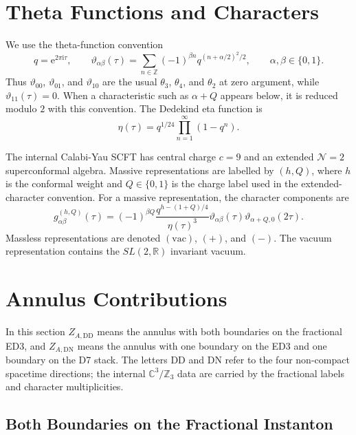 \documentclass[11pt]{article}
\newcommand{\C}{\mathbb{C}}
\newcommand{\R}{\mathbb{R}}
\newcommand{\Z}{\mathbb{Z}}
\newcommand{\vac}{\mathrm{vac}}
\newcommand{\DN}{\mathrm{DN}}
\newcommand{\DD}{\mathrm{DD}}
\newcommand{\ii}{\mathrm{i}}
\newcommand{\e}{\mathrm{e}}
\newcommand{\vart}{\vartheta}
\newcommand{\etaD}{\eta}
\begin{document}
\section{Theta Functions and Characters}

We use the theta-function convention
\begin{equation}
  q=\e^{2\pi \ii\tau},
  \qquad
  \vart_{\alpha\beta}(\tau)
  =
  \sum_{n\in\Z}
  (-1)^{\beta n}
  q^{(n+\alpha/2)^2/2},
  \qquad
  \alpha,\beta\in\{0,1\}.
  \label{eq:theta-convention}
\end{equation}
Thus $\vart_{00}$, $\vart_{01}$, and $\vart_{10}$ are the usual $\theta_3$, $\theta_4$,
and $\theta_2$ at zero argument, while $\vart_{11}(\tau)=0$. When a characteristic such as
$\alpha+Q$ appears below, it is reduced modulo $2$ with this convention. The Dedekind eta
function is
\begin{equation}
  \etaD(\tau)=q^{1/24}\prod_{n=1}^{\infty}(1-q^n).
  \label{eq:dedekind-eta-definition}
\end{equation}

The internal Calabi-Yau SCFT has central charge $c=9$ and an extended
$\mathcal N=2$ superconformal algebra. Massive representations are labelled by
$(h,Q)$, where $h$ is the conformal weight and $Q\in\{0,1\}$ is the charge label used in the
extended-character convention. For a massive representation, the character components are
\begin{equation}
  g_{\alpha\beta}^{(h,Q)}(\tau)
  =
  (-1)^{\beta Q}
  \frac{q^{h-(1+Q)/4}}{\etaD(\tau)^3}
  \vart_{\alpha\beta}(\tau)
  \vart_{\alpha+Q,0}(2\tau).
  \label{eq:massive-character}
\end{equation}
Massless representations are denoted $(\vac)$, $(+)$, and $(-)$. The vacuum representation
contains the $SL(2,\R)$ invariant vacuum.

\section{Annulus Contributions}

In this section \(Z_{A,\DD}\) means the annulus with both boundaries on the fractional ED3, and
\(Z_{A,\DN}\) means the annulus with one boundary on the ED3 and one boundary on the D7 stack.
The letters \(\DD\) and \(\DN\) refer to the four non-compact spacetime directions; the internal
\(\C^3/\Z_3\) data are carried by the fractional labels and character multiplicities.

\subsection{Both Boundaries on the Fractional Instanton}
\end{document}
